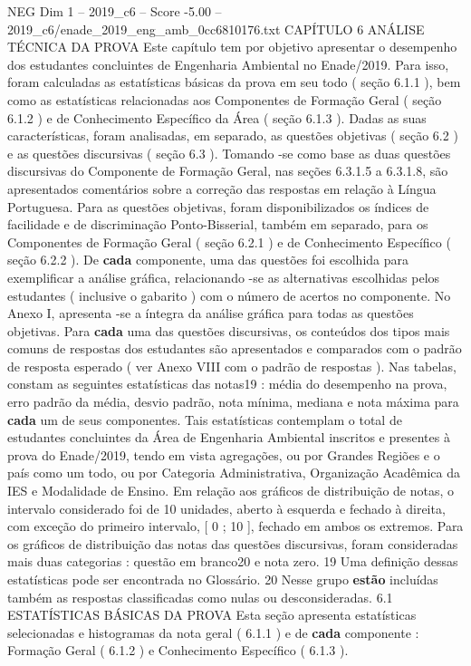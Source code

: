 \begin{textsample}{NEG Dim 1 – 2019\_c6 – Score -5.00 – 2019\_c6/enade\_2019\_eng\_amb\_0cc6810176.txt}  \label{ex:f1_neg_096}
CAPÍTULO 6 ANÁLISE TÉCNICA DA PROVA Este capítulo tem por objetivo apresentar o desempenho dos estudantes concluintes de Engenharia Ambiental no Enade/2019.
Para isso, foram calculadas as estatísticas básicas da prova em seu todo ( seção 6.1.1 ), bem como as estatísticas relacionadas aos Componentes de Formação Geral ( seção 6.1.2 ) e de Conhecimento Específico da Área ( seção 6.1.3 ).
Dadas as suas características, foram analisadas, em separado, as questões objetivas ( seção 6.2 ) e as questões discursivas ( seção 6.3 ).
Tomando -se como base as duas questões discursivas do Componente de Formação Geral, nas seções 6.3.1.5 a 6.3.1.8, são apresentados comentários sobre a correção das respostas em relação à Língua Portuguesa.
Para as questões objetivas, foram disponibilizados os índices de facilidade e de discriminação Ponto-Bisserial, também em separado, para os Componentes de Formação Geral ( seção 6.2.1 ) e de Conhecimento Específico ( seção 6.2.2 ).
De \textbf{cada} componente, uma das questões foi escolhida para exemplificar a análise gráfica, relacionando -se as alternativas escolhidas pelos estudantes ( inclusive o gabarito ) com o número de acertos no componente.
No Anexo I, apresenta -se a íntegra da análise gráfica para todas as questões objetivas.
Para \textbf{cada} uma das questões discursivas, os conteúdos dos tipos mais comuns de respostas dos estudantes são apresentados e comparados com o padrão de resposta esperado ( ver Anexo VIII com o padrão de respostas ).
Nas tabelas, constam as seguintes estatísticas das notas19 : média do desempenho na prova, erro padrão da média, desvio padrão, nota mínima, mediana e nota máxima para \textbf{cada} um de seus componentes.
Tais estatísticas contemplam o total de estudantes concluintes da Área de Engenharia Ambiental inscritos e presentes à prova do Enade/2019, tendo em vista agregações, ou por Grandes Regiões e o país como um todo, ou por Categoria Administrativa, Organização Acadêmica da IES e Modalidade de Ensino.
Em relação aos gráficos de distribuição de notas, o intervalo considerado foi de 10 unidades, aberto à esquerda e fechado à direita, com exceção do primeiro intervalo, [ 0 ; 10 ], fechado em ambos os extremos.
Para os gráficos de distribuição das notas das questões discursivas, foram consideradas mais duas categorias : questão em branco20 e nota zero. 19 Uma definição dessas estatísticas pode ser encontrada no Glossário. 20 Nesse grupo \textbf{estão} incluídas também as respostas classificadas como nulas ou desconsideradas. 6.1 ESTATÍSTICAS BÁSICAS DA PROVA Esta seção apresenta estatísticas selecionadas e histogramas da nota geral ( 6.1.1 ) e de \textbf{cada} componente : Formação Geral ( 6.1.2 ) e Conhecimento Específico ( 6.1.3 ).

\end{textsample}
